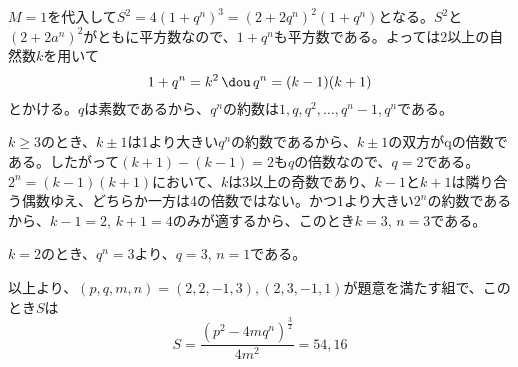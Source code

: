 $M=1$を代入して$S^2=4(1+q^n)^3=(2+2q^n)^2(1+q^n)$となる。$S^2$と$(2+2a^n)^2$がともに平方数なので、$1+q^n$も平方数である。よっては2以上の自然数$k$を用いて
\[ 1+q^n=k^2 \,\dou\, q^n=(k-1)(k+1) \]
とかける。$q$は素数であるから、$q^n$の約数は$1, q, q^2, \dots, q^n-1, q^n$である。

$k\ge 3$のとき、$k\pm 1$は1より大きい$q^n$の約数であるから、$k\pm 1$の双方がqの倍数である。したがって$(k+1)-(k-1)=2$も$q$の倍数なので、$q=2$である。$2^n=(k-1)(k+1)$において、$k$は3以上の奇数であり、$k-1$と$k+1$は隣り合う偶数ゆえ、どちらか一方は4の倍数ではない。かつ1より大きい$2^n$の約数であるから、$k-1=2$, $k+1=4$のみが適するから、このとき$k=3$, $n=3$である。

$k=2$のとき、$q^n=3$より、$q=3$, $n=1$である。

以上より、$(p, q, m, n)=(2, 2, -1, 3), (2, 3, -1, 1)$が題意を満たす組で、このとき$S$は
\[ S=\frac{(p^2-4mq^n)^\frac{3}{2}}{4m^2}=54, 16 \]